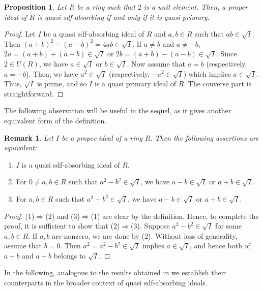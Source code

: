 \documentclass{amsart}%
\newtheorem{remark}{Remark}[section]
\newtheorem{proposition}{Proposition}[section]
\begin{document}
\begin{proposition}
Let $R$ be a ring such that $2$ is a unit element. Then, a proper ideal of $R$
is quasi sdf-absorbing if and only if it is quasi primary.
\end{proposition}

\begin{proof}
Let $I$ be a quasi sdf-absorbing ideal of $R$ and $a,b\in R$ such that
$ab\in\sqrt{I}$. Then $(a+b)^{2}-(a-b)^{2}=4ab\in\sqrt{I}$. If $a\neq b$ and
$a\neq-b$, $2a=(a+b)+(a-b)\in\sqrt{I}$ or $2b=(a+b)-(a-b)\in\sqrt{I}.$ Since
$2\in U(R)$, we have $a\in\sqrt{I}$ or $b\in\sqrt{I}$. Now assume that $a=b$
(respectively, $a=-b$). Then, we have $a^{2}\in\sqrt{I}$ (respectively,
$-a^{2}\in\sqrt{I}$) which implies $a\in\sqrt{I}$. Thus, $\sqrt{I}$ is prime,
and so $I$ is a quasi primary ideal of $R.$ The converse part is straightforward.
\end{proof}

The following observation will be useful in the sequel, as it gives another
equivalent form of the definition.

\begin{remark}
\label{rr}Let $I$ be a proper ideal of a ring $R.$ Then the following
assertions are equivalent:
\end{remark}

\begin{enumerate}
\item $I$ is a quasi sdf-absorbing ideal of $R.$

\item For $0\neq a,b\in R$ such that $a^{2}-b^{2}\in\sqrt{I}$, we have
$a-b\in\sqrt{I}$ or $a+b\in\sqrt{I}$.

\item For $a,b\in R$ such that $a^{2}-b^{2}\in\sqrt{I}$, we have $a-b\in
\sqrt{I}$ or $a+b\in\sqrt{I}$.
\end{enumerate}

\begin{proof}
(1)$\Rightarrow$(2) and (3)$\Rightarrow$(1) are clear by the definition.
Hence, to complete the proof, it is sufficient to show that (2)$\Rightarrow
$(3). Suppose $a^{2}-b^{2}\in\sqrt{I}$ for some $a,b\in R.$ If $a,b$ are
nonzero, we are done by (2). Without loss of generality, assume that $b=0.$
Then $a^{2}=a^{2}-b^{2}\in\sqrt{I}$ implies $a\in\sqrt{I}$, and hence both of
$a-b$ and $a+b$ belongs to $\sqrt{I}$.
\end{proof}

In the following, analogous to the results obtained in \cite[Theorems 3.7,
4.1, 4.5, 4.6]{AB2024} we establish their counterparts in the broader context
of quasi sdf-absorbing ideals.
\end{document}
